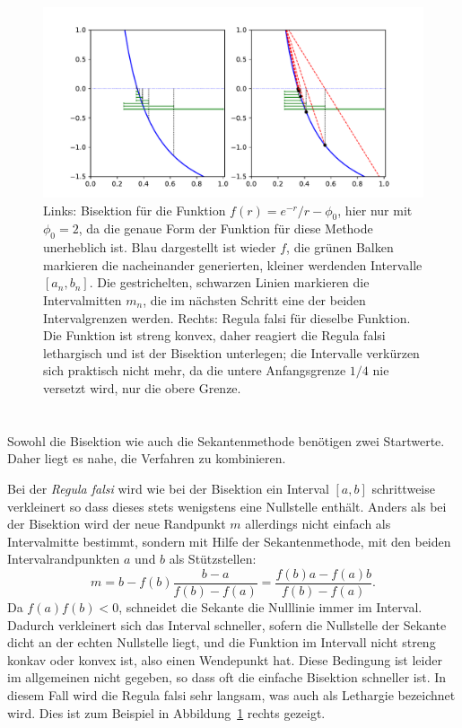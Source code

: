 \begin{figure}
  \centering
  \includegraphics[width=\textwidth]{plots/bisektion}
  \caption{Links: Bisektion für die Funktion $f(r) = e^{-r}/r -
    \phi_0$, hier nur mit $\phi_0=2$, da die genaue Form der Funktion
    für diese Methode unerheblich ist. Blau dargestellt ist wieder
    $f$, die grünen Balken markieren die nacheinander generierten,
    kleiner werdenden Intervalle $[a_n, b_n]$. Die gestrichelten,
    schwarzen Linien markieren die Intervalmitten $m_n$, die im
    nächsten Schritt eine der beiden Intervalgrenzen werden. Rechts:
    Regula falsi für dieselbe Funktion. Die Funktion ist streng
    konvex, daher reagiert die Regula falsi lethargisch und ist der
    Bisektion unterlegen; die Intervalle verkürzen sich praktisch
    nicht mehr, da die untere Anfangsgrenze $1/4$ nie versetzt wird,
    nur die obere Grenze.}
  \label{fig:bisektion}
\end{figure}

\section{}

Sowohl die Bisektion wie auch die Sekantenmethode benötigen zwei
Startwerte. Daher liegt es nahe, die Verfahren zu kombinieren.

Bei der \emph{Regula falsi} wird wie bei der Bisektion ein Interval
$[a,b]$ schrittweise verkleinert so dass dieses stets wenigstens eine
Nullstelle enthält. Anders als bei der Bisektion wird der neue
Randpunkt $m$ allerdings nicht einfach als Intervalmitte bestimmt,
sondern mit Hilfe der Sekantenmethode, mit den beiden
Intervalrandpunkten $a$ und $b$ als Stützstellen:
\begin{equation}
  m = b - f(b)\frac{b - a}{f(b) - f(a)} =
  \frac{f(b)a - f(a)b}{f(b) - f(a)}.
\end{equation}
Da $f(a)f(b)<0$, schneidet die Sekante die Nulllinie immer im
Interval.  Dadurch verkleinert sich das Interval schneller, sofern die
Nullstelle der Sekante dicht an der echten Nullstelle liegt, und die
Funktion im Intervall nicht streng konkav oder konvex ist, also einen
Wendepunkt hat. Diese Bedingung ist leider im allgemeinen nicht
gegeben, so dass oft die einfache Bisektion schneller ist. In diesem
Fall wird die Regula falsi sehr langsam, was auch als Lethargie
bezeichnet wird. Dies ist zum Beispiel in
Abbildung~\ref{fig:bisektion} rechts gezeigt.


